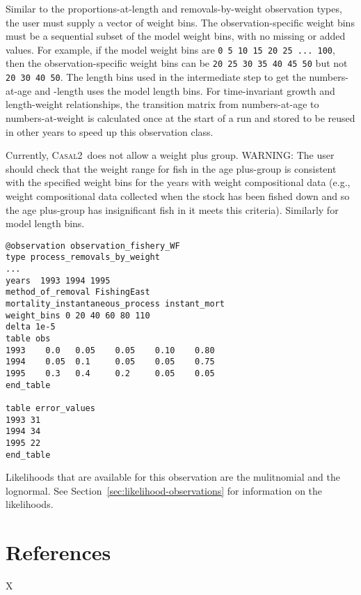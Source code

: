 \documentclass[a4paper,11pt,twoside,pdftex,draft]{article}
\newcommand{\CNAME}{\textsc{Casal2}}
\begin{document}
Similar to the proportions-at-length and removals-by-weight observation types, the user must supply a vector of weight bins. The observation-specific weight bins must be a sequential subset of the model weight bins, with no missing or added values. For example, if the model weight bins are \texttt{0 5 10 15 20 25 ... 100}, then the observation-specific weight bins can be \texttt{20 25 30 35 40 45 50} but not \texttt{20 30 40 50}. The length bins used in the intermediate step to get the numbers-at-age and -length uses the model length bins. For time-invariant growth and length-weight relationships, the transition matrix from numbers-at-age to numbers-at-weight is calculated once at the start of a run and stored to be reused in other years to speed up this observation class.

Currently, \CNAME~does not allow a weight plus group. WARNING: The user should check that the weight range for fish in the age plus-group is consistent with the specified weight bins for the years with weight compositional data (e.g., weight compositional data collected when the stock has been fished down and so the age plus-group has insignificant fish in it meets this criteria). Similarly for model length bins.

{\small{\begin{verbatim}
@observation observation_fishery_WF
type process_removals_by_weight
...
years  1993 1994 1995
method_of_removal FishingEast
mortality_instantaneous_process instant_mort
weight_bins 0 20 40 60 80 110
delta 1e-5
table obs
1993    0.0   0.05    0.05    0.10    0.80
1994    0.05  0.1     0.05    0.05    0.75
1995    0.3   0.4     0.2     0.05    0.05
end_table

table error_values
1993 31
1994 34
1995 22
end_table
\end{verbatim}}}

Likelihoods that are available for this observation are the mulitnomial and the lognormal. See Section~\ref{sec:likelihood-observations} for information on the  likelihoods.

\section{References}

X
\end{document}
